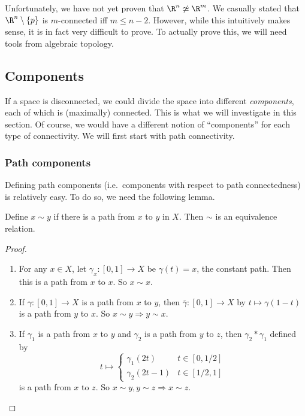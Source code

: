 \documentclass[a4paper]{article}
\begin{document}
Unfortunately, we have not yet proven that $\R^n \not\simeq \R^m$. We casually stated that $\R^n \setminus \{p\}$ is $m$-connected iff $m \leq n - 2$. However, while this intuitively makes sense, it is in fact very difficult to prove. To actually prove this, we will need tools from algebraic topology.

\subsection{Components}
If a space is disconnected, we could divide the space into different \emph{components}, each of which is (maximally) connected. This is what we will investigate in this section. Of course, we would have a different notion of ``components'' for each type of connectivity. We will first start with path connectivity.

\subsubsection{Path components}
Defining path components (i.e.\ components with respect to path connectedness) is relatively easy. To do so, we need the following lemma.

\begin{lemma}
  Define $x\sim y$ if there is a path from $x$ to $y$ in $X$. Then $\sim$ is an equivalence relation.
\end{lemma}

\begin{proof}\leavevmode
  \begin{enumerate}
    \item For any $x\in X$, let $\gamma_x: [0, 1] \to X$ be $\gamma(t) = x$, the constant path. Then this is a path from $x$ to $x$. So $x\sim x$.
    \item If $\gamma: [0, 1] \to X$ is a path from $x$ to $y$, then $\bar \gamma: [0, 1] \to X$ by $t \mapsto \gamma(1 - t)$ is a path from $y$ to $x$. So $x\sim y \Rightarrow y\sim x$.
    \item If $\gamma_1$ is a path from $x$ to $y$ and $\gamma_2$ is a path from $y$ to $z$, then $\gamma_2*\gamma_1$ defined by
      \[
        t\mapsto
        \begin{cases}
          \gamma_1(2t) & t\in [0, 1/2]\\
          \gamma_2(2t - 1) & t\in [1/2, 1]
        \end{cases}
      \]
      is a path from $x$ to $z$. So $x\sim y, y\sim z \Rightarrow x\sim z$.\qedhere
  \end{enumerate}
\end{proof}
\end{document}

